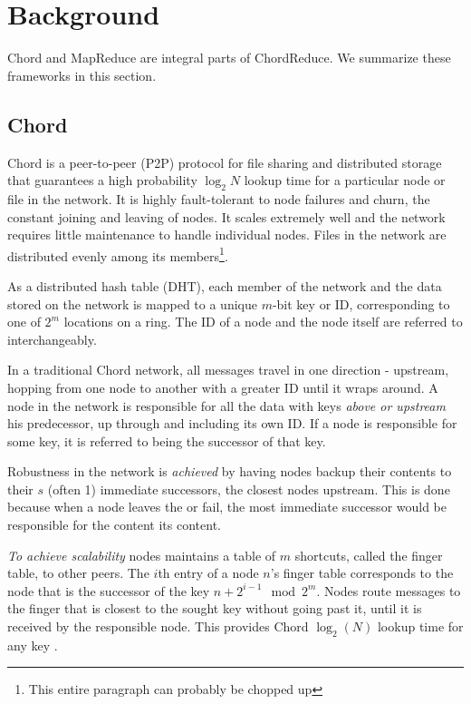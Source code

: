 \documentclass[10pt, conference, compsocconf]{IEEEtran}
\begin{document}
\section{Background}
Chord and MapReduce are integral parts of ChordReduce.  We summarize these frameworks in this section.

\subsection{Chord}
Chord \cite{Chord} is a peer-to-peer (P2P) protocol for file sharing and distributed storage that guarantees a high probability $\log_{2} N$ lookup time for a particular node or file in the network. 
It is highly fault-tolerant to node failures and churn, the constant joining and leaving of nodes.  It scales extremely well and the network requires little maintenance to handle individual nodes.  
Files in the network are distributed evenly among its members\footnote{This entire paragraph can probably be chopped up}.

As a distributed hash table (DHT), each member of the network and the data stored on the network is mapped to a unique $m$-bit key or ID, corresponding to one of  $2^m$ locations on a ring. 
The ID of a node and the node itself are referred to interchangeably.

In a traditional Chord network, all messages travel in one direction - upstream, hopping from one node to another with a greater ID until it wraps around.
A node in the network is responsible for all the data with keys \textit{above or upstream} his predecessor, up through and including its own ID.  If a node is responsible for some key, it is referred to being the successor of that key.

Robustness in the network is \textit{achieved} by having nodes backup their contents to their $s$ (often 1) immediate successors, the closest nodes upstream.  
This is done because when a node leaves the or fail, the most immediate successor would be responsible for the content its content.

\textit{To achieve scalability} nodes maintains a table of $m$ shortcuts, called the finger table, to other peers.   The $i$th entry of a node $n$'s finger table corresponds to the node that is the successor of the key $n+2^{i-1} \mod 2^m $.  Nodes route messages to the finger that is closest to the sought key without going past it, until it is received by the responsible node.  This provides Chord $\log_2(N)$ lookup time for any key \cite{Chord}.
\end{document}
